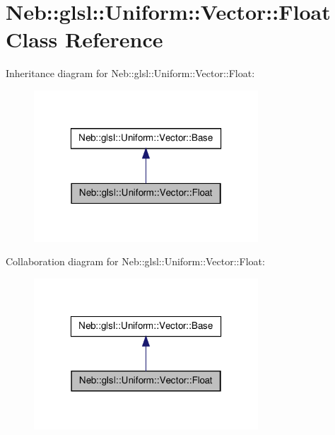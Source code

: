 \hypertarget{classNeb_1_1glsl_1_1Uniform_1_1Vector_1_1Float}{\section{\-Neb\-:\-:glsl\-:\-:\-Uniform\-:\-:\-Vector\-:\-:\-Float \-Class \-Reference}
\label{classNeb_1_1glsl_1_1Uniform_1_1Vector_1_1Float}
}


\-Inheritance diagram for \-Neb\-:\-:glsl\-:\-:\-Uniform\-:\-:\-Vector\-:\-:\-Float\-:\nopagebreak
\begin{figure}[H]
\begin{center}
\leavevmode
\includegraphics[width=238pt]{classNeb_1_1glsl_1_1Uniform_1_1Vector_1_1Float__inherit__graph}
\end{center}
\end{figure}


\-Collaboration diagram for \-Neb\-:\-:glsl\-:\-:\-Uniform\-:\-:\-Vector\-:\-:\-Float\-:\nopagebreak
\begin{figure}[H]
\begin{center}
\leavevmode
\includegraphics[width=238pt]{classNeb_1_1glsl_1_1Uniform_1_1Vector_1_1Float__coll__graph}
\end{center}
\end{figure}

